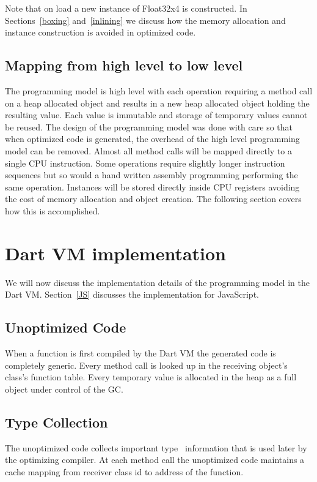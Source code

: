 \documentclass[preprint]{sigplanconf}
\begin{document}
Note that on load a new instance of Float32x4 is constructed. In
Sections~\ref{boxing} and~\ref{inlining} we discuss how the memory allocation
and instance construction is avoided in optimized code.

\subsection{Mapping from high level to low level}

The programming model is high level with each operation requiring a method call
on a heap allocated object and results in a new heap allocated object holding
the resulting value. Each value is immutable and storage of temporary values
cannot be reused. The design of the programming model was done with care so that
when optimized code is generated, the overhead of the high level programming
model can be removed. Almost all method calls will be mapped directly to a
single CPU instruction. Some operations require slightly longer instruction
sequences but so would a hand written assembly programming performing the same
operation. Instances will be stored directly inside CPU registers avoiding the
cost of memory allocation and object creation. The following section covers how
this is accomplished.

\section{Dart VM implementation}

We will now discuss the implementation details of the programming model in the
Dart VM. Section~\ref{JS} discusses the implementation for JavaScript.

\subsection{Unoptimized Code}

When a function is first compiled by the Dart VM the generated code is
completely generic. Every method call is looked up in the receiving object's
class's function table. Every temporary value is allocated in the heap as a full
object under control of the GC.

\subsection{Type Collection}

The unoptimized code collects important type~\cite{typefeedback} information
that is used later by the optimizing compiler. At each method call the
unoptimized code maintains a cache mapping from receiver class id to address of
the function.
\end{document}
